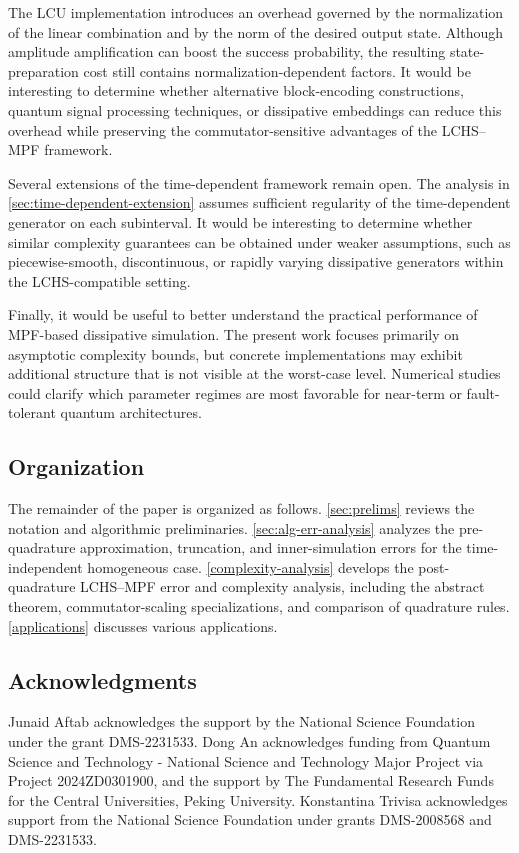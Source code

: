 \documentclass[10pt,reqno]{article}
\numberwithin{equation}{section}
\theoremstyle{plain}
\theoremstyle{definition}
\begin{document}
The LCU implementation introduces an overhead governed by the normalization of the linear combination and by the norm of the desired output state. Although amplitude amplification can boost the success probability, the resulting state-preparation cost still contains normalization-dependent factors. It would be interesting to determine whether alternative block-encoding constructions, quantum signal processing techniques, or dissipative embeddings can reduce this overhead while preserving the commutator-sensitive advantages of the LCHS--MPF framework.

Several extensions of the time-dependent framework remain open. The analysis in \cref{sec:time-dependent-extension} assumes sufficient regularity of the time-dependent generator on each subinterval. It would be interesting to determine whether similar complexity guarantees can be obtained under weaker assumptions, such as piecewise-smooth, discontinuous, or rapidly varying dissipative generators within the LCHS-compatible setting.

Finally, it would be useful to better understand the practical performance of MPF-based dissipative simulation. The present work focuses primarily on asymptotic complexity bounds, but concrete implementations may exhibit additional structure that is not visible at the worst-case level. Numerical studies could clarify which parameter regimes are most favorable for near-term or fault-tolerant quantum architectures.

\subsection{Organization}
The remainder of the paper is organized as follows.
\cref{sec:prelims} reviews the notation and algorithmic preliminaries. \cref{sec:alg-err-analysis} analyzes the pre-quadrature approximation, truncation, and inner-simulation errors for the time-independent homogeneous case. \cref{complexity-analysis} develops the post-quadrature LCHS--MPF error and complexity analysis, including the abstract theorem, commutator-scaling specializations, and comparison of quadrature rules.  \cref{applications} discusses various applications.

\subsection*{Acknowledgments} 
Junaid Aftab acknowledges the support by the National Science Foundation under the grant DMS-2231533.
Dong An acknowledges funding from Quantum Science and Technology - National Science and Technology Major Project via Project 2024ZD0301900, and the support by The Fundamental Research Funds for the Central Universities, Peking University.
Konstantina Trivisa acknowledges support from the National Science Foundation under grants DMS-2008568 and DMS-2231533.
\end{document}
